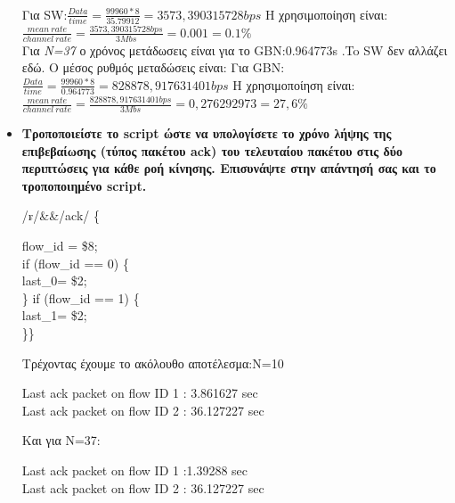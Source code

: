 \documentclass{article}
\begin{document}
\begin{itemize}
	\\
	Για  SW:$\frac{Data}{time}=\frac{99960*8}{35.79912}=3573,390315728bps$
	Η χρησιμοποίηση είναι:
	$\frac{mean\ rate}{channel\ rate}=\frac{3573,390315728bps}{3Mbs}=0.001=0.1 \%$\\
	Για \textit{N=37} ο χρόνος μετάδωσεις είναι για το GBN:0.964773s .To SW δεν αλλάζει εδώ.
		Ο μέσος ρυθμός μεταδώσεις είναι:
		Για GBN: $\frac{Data}{time}=\frac{99960*8}{0.964773}=828878,917631401bps$
		Η χρησιμοποίηση είναι:
		$\frac{mean\ rate}{channel\ rate}=\frac{828878,917631401bps}{3Mbs}=0,276292973=27,6 \%$
		\\
	\item \textbf{Τροποποιείστε το script ώστε να υπολογίσετε το χρόνο λήψης της επιβεβαίωσης (τύπος πακέτου
		ack) του τελευταίου πακέτου στις δύο περιπτώσεις για κάθε ροή κίνησης. Επισυνάψτε στην
		απάντησή σας και το τροποποιημένο script.}\\
	\begin{framed}/r$\hat{}$/\&\&/ack/ \{
		
		flow\_id = \$8;\\
		if (flow\_id == 0) \{\\
			last\_0= \$2;\\
		\}
		if (flow\_id == 1) \{\\
			last\_1= \$2;\\
		\}\}
	\end{framed}
		Τρέχοντας έχουμε το ακόλουθο αποτέλεσμα:N=10\begin{framed}Last ack packet on flow ID 1	: 3.861627 sec\\
			Last ack packet on flow ID 2	: 36.127227 sec
			\end{framed}
			Και για N=37:\begin{framed}Last ack packet on flow ID 1	:1.39288 sec
				\\
				Last ack packet on flow ID 2	: 36.127227 sec
			\end{framed}
\end{itemize}
\end{document}
